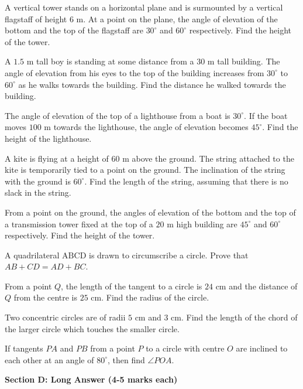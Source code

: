 \documentclass[12pt,a4paper]{exam}
\begin{document}
\begin{questions}
\question[3] A vertical tower stands on a horizontal plane and is surmounted by a vertical flagstaff of height $6$ m. At a point on the plane, the angle of elevation of the bottom and the top of the flagstaff are $30^{\circ}$ and $60^{\circ}$ respectively. Find the height of the tower.
\vspace{0.15cm}

\question[3] A $1.5$ m tall boy is standing at some distance from a $30$ m tall building. The angle of elevation from his eyes to the top of the building increases from $30^{\circ}$ to $60^{\circ}$ as he walks towards the building. Find the distance he walked towards the building.
\vspace{0.15cm}

\question[3] The angle of elevation of the top of a lighthouse from a boat is $30^{\circ}$. If the boat moves $100$ m towards the lighthouse, the angle of elevation becomes $45^{\circ}$. Find the height of the lighthouse.
\vspace{0.15cm}

\question[3] A kite is flying at a height of $60$ m above the ground. The string attached to the kite is temporarily tied to a point on the ground. The inclination of the string with the ground is $60^{\circ}$. Find the length of the string, assuming that there is no slack in the string.
\vspace{0.15cm}

\question[3] From a point on the ground, the angles of elevation of the bottom and the top of a transmission tower fixed at the top of a $20$ m high building are $45^{\circ}$ and $60^{\circ}$ respectively. Find the height of the tower.
\vspace{0.15cm}

\question[3] A quadrilateral $\text{ABCD}$ is drawn to circumscribe a circle. Prove that $AB + CD = AD + BC$.
\vspace{0.15cm}

\question[3] From a point $Q$, the length of the tangent to a circle is $24$ cm and the distance of $Q$ from the centre is $25$ cm. Find the radius of the circle.
\vspace{0.15cm}

\question[3] Two concentric circles are of radii $5$ cm and $3$ cm. Find the length of the chord of the larger circle which touches the smaller circle.
\vspace{0.15cm}

\question[3] If tangents $PA$ and $PB$ from a point $P$ to a circle with centre $O$ are inclined to each other at an angle of $80^\circ$, then find $\angle POA$.
\vspace{0.15cm}

\end{questions}
\bigskip
\noindent\textbf{\large Section D: Long Answer (4-5 marks each)}
\end{document}
